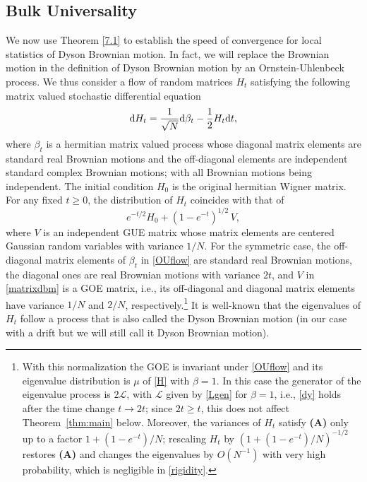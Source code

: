 \documentclass[draft]{article}
\newcommand{\rd}{{\rm d}}
\newcommand{\be}{\begin{equation}}
\newcommand{\ee}{\end{equation}}
\newcommand{\cL}{{\mathscr L}}
\numberwithin{equation}{section}
\numberwithin{theorem}{section}
\numberwithin{definition}{section}
\numberwithin{remark}{section}
\begin{document}
\subsection{Bulk Universality}





We now  use Theorem \ref{7.1}   to establish the speed of convergence 
 for local statistics  of Dyson Brownian motion.
 In fact, we will replace the Brownian motion in the definition
of Dyson Brownian motion by an Ornstein-Uhlenbeck  process. We thus
consider a flow of random matrices $H_t$ satisfying 
the following matrix valued stochastic differential equation
\be
   \rd H_t = \frac{1}{\sqrt{N}}\rd\beta_t - \frac{1}{2}H_t \rd t,
\label{OUflow}
\ee
where $\beta_t$ is a hermitian matrix valued process 
whose diagonal matrix elements are standard real Brownian motions
and the off-diagonal elements are independent standard complex Brownian motions;
with all Brownian motions being independent. The initial condition $H_0$
is the original  hermitian Wigner matrix.
For any fixed $t\ge 0$, the distribution of $H_t$ coincides with that of
\be\label{matrixdbm}
e^{-t/2} H_0 + (1-e^{-t})^{1/2}\, V,
\ee
where 
$V$ is an independent  GUE 
 matrix whose matrix elements are centered Gaussian random variables with variance $1/N$. 
For the symmetric case, the off-diagonal matrix elements of $\beta_t$ in \eqref{OUflow}
are standard real Brownian motions, the diagonal ones are real Brownian motions with variance $2t$,
and $V$ in \eqref{matrixdbm} is a GOE matrix, i.e., its off-diagonal and diagonal matrix elements
have variance $1/N$ and $2/N$, respectively.\footnote{With this normalization the GOE is invariant
under \eqref{OUflow} and its eigenvalue distribution is $\mu$ of \eqref{H} with $\beta=1$.
In this case the generator of the eigenvalue process is $2\cL$, with $\cL$ given by \eqref{Lgen} for $\beta=1$,
i.e., \eqref{dy} holds after the time change $t\to 2t$; since $2t\ge t$, this does not affect
Theorem~\ref{thm:main} below. Moreover, the variances of $H_t$ satisfy {\bf (A)} only up to a factor
$1+(1-e^{-t})/N$; rescaling $H_t$ by $(1+(1-e^{-t})/N)^{-1/2}$ restores {\bf (A)} and changes the
eigenvalues by $O(N^{-1})$ with very high probability, which is negligible in \eqref{rigidity}.}
 It is well-known that the eigenvalues of $H_t$ follow a process
that is also called the Dyson Brownian motion
 (in our case with a drift but we will still call it Dyson Brownian motion).
 
\end{document}
